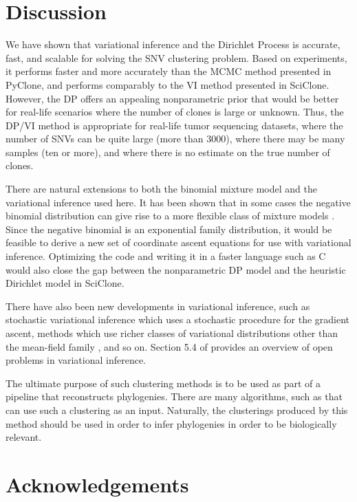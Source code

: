 \documentclass[11pt]{article}
\begin{document}
\newpage
\section{Discussion}

We have shown that variational inference and the Dirichlet Process is accurate, fast, and scalable for solving the SNV clustering problem. Based on experiments, it performs faster and more accurately than the MCMC method presented in PyClone, and performs comparably to the VI method presented in SciClone. However, the DP offers an appealing nonparametric prior that would be better for real-life scenarios where the number of clones is large or unknown. Thus, the DP/VI method is appropriate for real-life tumor sequencing datasets, where the number of SNVs can be quite large (more than 3000), where there may be many samples (ten or more), and where there is no estimate on the true number of clones.

There are natural extensions to both the binomial mixture model and the variational inference used here. It has been shown that in some cases the negative binomial distribution can give rise to a more flexible class of mixture models \cite{Zhou2012}. Since the negative binomial is an exponential family distribution, it would be feasible to derive a new set of coordinate ascent equations for use with variational inference. Optimizing the code and writing it in a faster language such as C would also close the gap between the nonparametric DP model and the heuristic Dirichlet model in SciClone.

There have also been new developments in variational inference, such as stochastic variational inference \cite{hoffman2013} which uses a stochastic procedure for the gradient ascent, methods which use richer classes of variational distributions other than the mean-field family \cite{rezende2015}, and so on. Section 5.4 of \cite{blei2016} provides an overview of open problems in variational inference.

The ultimate purpose of such clustering methods is to be used as part of a pipeline that reconstructs phylogenies. There are many algorithms, such as \cite{Ancestree} that can use such a clustering as an input. Naturally, the clusterings produced by this method should be used in order to infer phylogenies in order to be biologically relevant.

\section{Acknowledgements}
\end{document}
